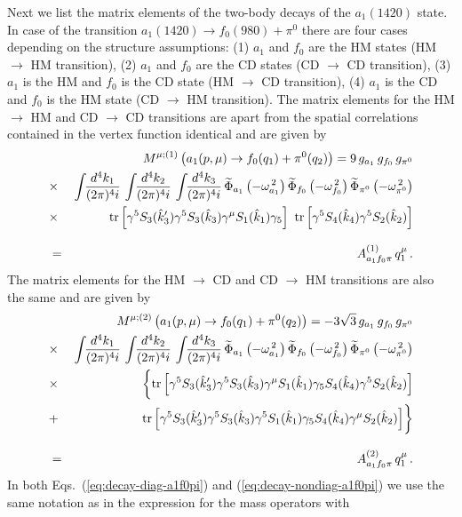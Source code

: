 \documentclass[aps,prd,floatfix,superscriptaddress,showpacs,showkeys]{revtex4}
\newcommand{\bea}{\begin{eqnarray}}
\newcommand{\ena}{\end{eqnarray}}
\newcommand{\nn}{\nonumber\\}
\newcommand{\Tr}{\mbox{\rm{tr}}}
\begin{document}
Next we list the matrix elements of the two-body decays 
of the $a_1(1420)$ state. In case of the transition
$a_1(1420) \to f_0(980) + \pi^0$ there are four cases 
depending on the structure assumptions: 
(1) $a_1$ and $f_0$ are the HM states (HM $\to$ HM transition), 
(2) $a_1$ and $f_0$ are the CD states (CD $\to$ CD transition), 
(3) $a_1$ is the HM and $f_0$ is the CD state (HM $\to$ CD transition), 
(4) $a_1$ is the CD and $f_0$ is the HM state (CD $\to$ HM transition). 
The matrix elements for the HM $\to$ HM and CD $\to$ CD transitions 
are apart from the spatial correlations contained in the vertex function 
identical and are given by 
\bea
&&
M^{\mu; (1)}\left( a_1(p,\mu) \to f_0(q_1)+\pi^0(q_2)\right)
= 9\,g_{a_1} \, g_{f_0} \, g_{\pi^0} \nonumber\\
&\times&
\int\!\!\frac{d^4k_1}{(2\pi)^4i}\,
\int\!\!\frac{d^4k_2}{(2\pi)^4i}\,
\int\!\!\frac{d^4k_3}{(2\pi)^4i}\,
\widetilde\Phi_{a_1}\left(-\omega_{a_1}^{\,2}\right)
\widetilde\Phi_{f_0}\left(-\omega_{f_0}^{\,2}\right)
\widetilde\Phi_{\pi^0}\left(-\omega_{\pi^0}^{\,2}\right)
\nn
&\times& 
%
\,\,\Tr\left[ \gamma^5   S_3(\hat{k}_3') \gamma^5 S_3(\hat{k}_3) 
              \gamma^\mu S_1(\hat{k}_1)\gamma_5 \right] \ 
    \Tr\left[ \gamma^5   S_4(\hat{k}_4) \gamma^5 S_2(\hat{k}_2) \right]  
\nn[2ex]
&=& A_{a_1f_0\pi}^{(1)}\, q_1^\mu \,. 
\label{eq:decay-diag-a1f0pi}
\ena 
The matrix elements for the HM $\to$ CD and CD $\to$ HM transitions are 
also the same and are given by 
\bea
&&
M^{\mu; (2)}\left( a_1(p,\mu) \to f_0(q_1)+\pi^0(q_2)\right)
=  - 3 \sqrt{3} \,g_{a_1} \, g_{f_0} \, g_{\pi^0} \nonumber\\
&\times&
\int\!\!\frac{d^4k_1}{(2\pi)^4i}\,
\int\!\!\frac{d^4k_2}{(2\pi)^4i}\,
\int\!\!\frac{d^4k_3}{(2\pi)^4i}\,
\widetilde\Phi_{a_1}\left(-\omega_{a_1}^{\,2}\right)
\widetilde\Phi_{f_0}\left(-\omega_{f_0}^{\,2}\right)
\widetilde\Phi_{\pi^0}\left(-\omega_{\pi^0}^{\,2}\right)
\nn
&\times& 
%
\,\,\biggl\{\Tr\left[ \gamma^5   S_3(\hat{k}_3') \gamma^5 S_3(\hat{k}_3) 
                      \gamma^\mu S_1(\hat{k}_1)  \gamma_5 S_4(\hat{k}_4) 
                      \gamma^5   S_2(\hat{k}_2)  \right]  \nonumber\\
&+& 
%
 \,\,\Tr\left[ \gamma^5   S_3(\hat{k}_3') \gamma^5 S_3(\hat{k}_3) 
                      \gamma^5   S_1(\hat{k}_1)  \gamma_5 S_4(\hat{k}_4) 
                      \gamma^\mu S_2(\hat{k}_2)  \right]  
\biggr\}
\nn[2ex]
&=& A_{a_1f_0\pi}^{(2)}\, q_1^\mu \,. 
\label{eq:decay-nondiag-a1f0pi}
\ena
In both Eqs.~(\ref{eq:decay-diag-a1f0pi}) and (\ref{eq:decay-nondiag-a1f0pi}) 
we use the same notation as in the expression for the mass operators with
\end{document}
